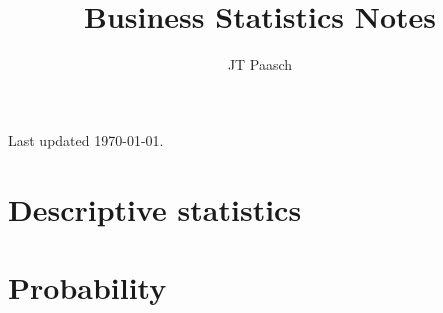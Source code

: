 \documentclass{book} %
\numberwithin{example}{section}
\numberwithin{remark}{section}
\numberwithin{note}{section}
\begin{document}
\frontmatter 

\title{Business Statistics Notes}
\author{JT Paasch}

\maketitle
\newpage

\thispagestyle{empty}
\mbox{}\vfill

\begin{center}
Last updated \today.
\end{center}

\tableofcontents

\mainmatter



\part{Descriptive statistics}







\part{Probability}




















\end{document}
